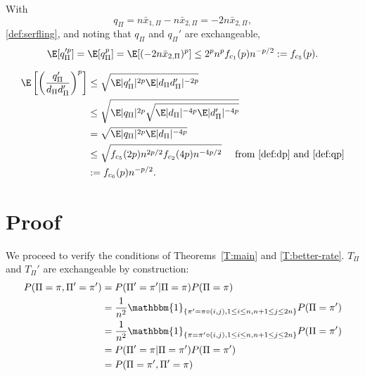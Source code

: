 With
\begin{equation}
  \label{eq:qpi}
  q_{\Pi} = n\bar{x}_{1,\Pi} - n\bar{x}_{2,\Pi} = -2n\bar{x}_{2,\Pi},
\end{equation}
\eqref{def:serfling}, and noting that $q_{\Pi}$ and $q_{\Pi}'$ are exchangeable,
\begin{equation}
\label{def:qp}
  \E[q_{\Pi}'^p] = \E[q_{\Pi}^p] = \E[(-2n\bar{x}_{2,\Pi})^p]
  \leq 2^pn^p f_{c_1}(p)n^{-p/2} := f_{c_5}(p).
\end{equation}

\begin{align}
  \E \left [ \left ( \frac{q_{\Pi}'}{d_{\Pi}d_{\Pi}'} \right )^p \right ]
  &\leq \sqrt{\E |q_{\Pi}'|^{2p} \E |d_{\Pi}d_{\Pi}'|^{-2p}} \nonumber \\
  &\leq \sqrt{\E |q_{\Pi}|^{2p} \sqrt{\E |d_{\Pi}|^{-4p} \E |d_{\Pi}'|^{-4p}}} \nonumber \\
  &= \sqrt{\E |q_{\Pi}|^{2p} \E |d_{\Pi}|^{-4p}} \nonumber \\
  &\leq \sqrt{f_{c_5}(2p) n^{2p/2} f_{c_2}(4p) n^{-4p/2}} \quad \text{ from
  } \eqref{def:dp} \text{ and } \eqref{def:qp} \nonumber \\
  &:= f_{c_6}(p) n^{-p/2} \label{def:qpddp}.
\end{align}

\section{Proof}
We proceed to verify the conditions of Theorems~\ref{T:main} and \ref{T:better-rate}.
$T_{\Pi}$ and $T_{\Pi}'$ are exchangeable by construction:
\begin{align*}
  P(\Pi = \pi, \Pi' = \pi') &= P(\Pi' = \pi' | \Pi = \pi)P(\Pi = \pi) \\
  &= \frac{1}{n^2}\mathbbm{1}_{\{\pi'=\pi \circ (i,j), 1\leq i \leq n, n+1 \leq j \leq 2n\}} P(\Pi =
  \pi') \\
  &=\frac{1}{n^2}\mathbbm{1}_{\{\pi=\pi' \circ (i,j), 1\leq i \leq n, n+1 \leq j \leq 2n\}} P(\Pi =
  \pi') \\
  &= P(\Pi' = \pi | \Pi = \pi')P(\Pi = \pi') \\
  &= P(\Pi = \pi', \Pi' = \pi)
\end{align*}

